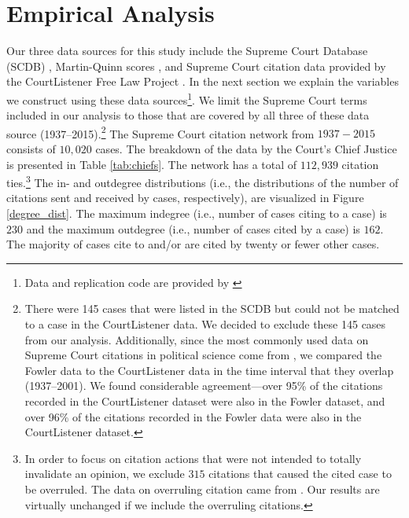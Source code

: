\documentclass[headsepline=true, abstracton]{scrartcl}
\begin{document}
\section{Empirical Analysis}
Our three data sources for this study include the Supreme Court Database (SCDB) \citep{spaeth2014supreme}, Martin-Quinn scores \citep{martin2002dynamic}, and Supreme Court citation data provided by the CourtListener Free Law Project \citep{CourtListener}. In the next section we explain the variables we construct using these data sources\footnote{Data and replication code are provided by \citet{replicationdata}}. We limit the Supreme Court terms included in our analysis to those that are covered by all three of these data source (1937--2015).\footnote{There were 145 cases that were listed in the SCDB but could not be matched to a case in the CourtListener data. We decided to exclude these 145 cases from our analysis. Additionally, since the most commonly used data on Supreme Court citations in political science come from \citet{fowler2007network}, we compared the Fowler data to the CourtListener data in the time interval that they overlap (1937--2001). We found considerable agreement---over 95\% of the citations recorded in the CourtListener dataset were also in the Fowler dataset, and over 96\% of the citations recorded in the Fowler data were also in the CourtListener dataset.} The Supreme Court citation network from $1937 - 2015$ consists of $10,020$ cases. The breakdown of the data by the Court's Chief Justice is presented in Table \ref{tab:chiefs}. The network has a total of $112,939$ citation ties.\footnote{In order to focus on citation actions that were not intended to totally invalidate an opinion, we exclude $315$ citations that caused the cited case to be overruled. The data on overruling citation came from \citet{senate2016constitution}. Our results are virtually unchanged if we include the overruling citations.} The in- and outdegree distributions (i.e., the distributions of the number of citations sent and received by cases, respectively), are visualized in Figure \ref{degree_dist}. The maximum indegree (i.e., number of cases citing to a case) is $230$ and the maximum outdegree (i.e., number of cases cited by a case) is $162$. The majority of cases cite to and/or are cited by twenty or fewer other cases.
\end{document}
